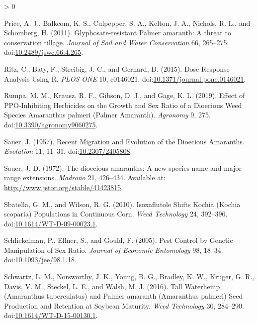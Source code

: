 \documentclass[utf8]{frontiersSCNS}
\newlength{\cslhangindent}
\newenvironment{CSLReferences}[2] %
 {%
  \setlength{\parindent}{0pt}
  \ifodd #1 \everypar{\setlength{\hangindent}{\cslhangindent}}\ignorespaces\fi
  \ifnum #2 > 0
  \setlength{\parskip}{#2\baselineskip}
  \fi
 }%
 {}
\begin{document}
\begin{CSLReferences}{1}{0}
\leavevmode\hypertarget{ref-price2011}{}%
Price, A. J., Balkcom, K. S., Culpepper, S. A., Kelton, J. A., Nichols,
R. L., and Schomberg, H. (2011). Glyphosate-resistant {Palmer} amaranth:
{A} threat to conservation tillage. \emph{Journal of Soil and Water
Conservation} 66, 265--275.
doi:\href{https://doi.org/10.2489/jswc.66.4.265}{10.2489/jswc.66.4.265}.

\leavevmode\hypertarget{ref-ritz2015}{}%
Ritz, C., Baty, F., Streibig, J. C., and Gerhard, D. (2015).
Dose-{Response Analysis Using R}. \emph{PLOS ONE} 10, e0146021.
doi:\href{https://doi.org/10.1371/journal.pone.0146021}{10.1371/journal.pone.0146021}.

\leavevmode\hypertarget{ref-rumpa2019}{}%
Rumpa, M. M., Krausz, R. F., Gibson, D. J., and Gage, K. L. (2019).
Effect of {PPO}-{Inhibiting Herbicides} on the {Growth} and {Sex Ratio}
of a {Dioecious Weed Species Amaranthus} palmeri ({Palmer Amaranth}).
\emph{Agronomy} 9, 275.
doi:\href{https://doi.org/10.3390/agronomy9060275}{10.3390/agronomy9060275}.

\leavevmode\hypertarget{ref-sauer1957}{}%
Sauer, J. (1957). Recent {Migration} and {Evolution} of the {Dioecious
Amaranths}. \emph{Evolution} 11, 11--31.
doi:\href{https://doi.org/10.2307/2405808}{10.2307/2405808}.

\leavevmode\hypertarget{ref-sauer1972}{}%
Sauer, J. D. (1972). The dioecious amaranths: A new species name and
major range extensions. \emph{Madroño} 21, 426--434. Available at:
\url{http://www.jstor.org/stable/41423815}.

\leavevmode\hypertarget{ref-sbatella2010}{}%
Sbatella, G. M., and Wilson, R. G. (2010). Isoxaflutole {Shifts Kochia}
({Kochia} scoparia) {Populations} in {Continuous Corn}. \emph{Weed
Technology} 24, 392--396.
doi:\href{https://doi.org/10.1614/WT-D-09-00023.1}{10.1614/WT-D-09-00023.1}.

\leavevmode\hypertarget{ref-schliekelman2005}{}%
Schliekelman, P., Ellner, S., and Gould, F. (2005). Pest {Control} by
{Genetic Manipulation} of {Sex Ratio}. \emph{Journal of Economic
Entomology} 98, 18--34.
doi:\href{https://doi.org/10.1093/jee/98.1.18}{10.1093/jee/98.1.18}.

\leavevmode\hypertarget{ref-schwartz2016}{}%
Schwartz, L. M., Norsworthy, J. K., Young, B. G., Bradley, K. W.,
Kruger, G. R., Davis, V. M., Steckel, L. E., and Walsh, M. J. (2016).
Tall {Waterhemp} ({Amaranthus} tuberculatus) and {Palmer} amaranth
({Amaranthus} palmeri) {Seed Production} and {Retention} at {Soybean
Maturity}. \emph{Weed Technology} 30, 284--290.
doi:\href{https://doi.org/10.1614/WT-D-15-00130.1}{10.1614/WT-D-15-00130.1}.


\end{CSLReferences}
\end{document}
